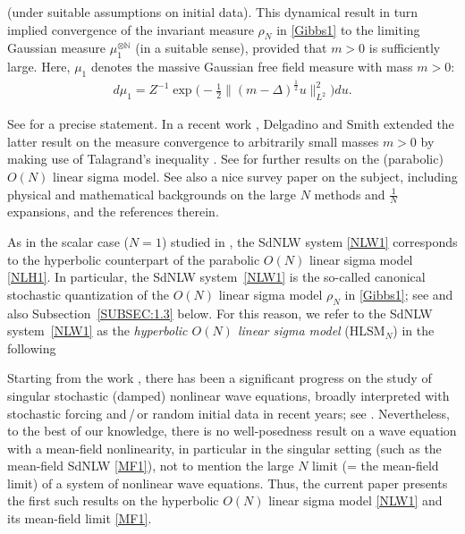 \documentclass[letterpaper, 11pt,  reqno]{amsart}
\newcommand{\1}{\hspace{0.5mm}\text{I}\hspace{0.2mm}}
\newcommand{\noi}{\noindent}
\newcommand{\N}{\mathbb{N}}
\newcommand{\Dl}{\Delta}
\newcommand{\HLSS}{$\text{HLSM}_N$}
\numberwithin{equation}{section}
\numberwithin{theorem}{section}
\begin{document}
\noi
(under suitable assumptions on initial data).
This dynamical result in turn implied
convergence   of the invariant measure $\rho_N$ in \eqref{Gibbs1}
to the limiting Gaussian measure $\mu_1^{\otimes \N}$
(in a suitable sense), 
provided that $m > 0$ is sufficiently large.
Here, 
$\mu_1$
denotes the massive
Gaussian free field measure with mass $m > 0$:
\begin{align}
    d \mu_{1} = Z^{-1} \exp\bigg(-\frac 12  \| (m - \Dl)^\frac 12 u \|_{L^2}^2 \bigg) du.
\label{gauss0}
\end{align}


\noi
See \cite[Theorem 1.2]{SSZZ} for a precise statement.
In a recent work \cite{DS}, 
Delgadino and Smith 
extended the latter result on the measure convergence to 
arbitrarily small masses $m > 0$
by making use of 
Talagrand's inequality
\cite{Tala, OV, FU}.
See \cite{SZZ1, SZZ2}
for further results 
on the (parabolic) $O (N)$ linear sigma model.
See also a nice survey paper 
 \cite{Shen} 
 on the subject, including 
physical and mathematical backgrounds on the large $N$ methods
and $\frac 1N$ expansions,
and the references therein.







As in the scalar case ($N = 1$)
studied in \cite{GKOT}, 
the SdNLW system \eqref{NLW1} corresponds to  the hyperbolic 
counterpart of the 
parabolic $O(N)$ linear sigma model \eqref{NLH1}.
In particular, 
 the SdNLW system~\eqref{NLW1} is the so-called canonical stochastic quantization of the $O(N)$ linear sigma model $\rho_N$ in \eqref{Gibbs1}; see \cite{RSS} and also Subsection~\ref{SUBSEC:1.3} below. For this reason, we  refer to the SdNLW system~\eqref{NLW1} as the {\it hyperbolic $O(N)$ linear sigma model}
 (\HLSS)
 in the following






 Starting from the work \cite{OTh2, GKO}, 
there has been a significant progress on the study 
of singular stochastic (damped) nonlinear wave equations, 
broadly interpreted with stochastic forcing and\,/\,or random initial data
in recent years; 
see
 \cite{
Deya, GKO2, OPTz, GKOT,  Tolo1, OOR, OO,  OOT1, Bring2,  OOT, ORTz,  OOTz, OWZ, 
STzX, BLL,  OTWZ, BDNY,
Zine}.
Nevertheless, to the best of our knowledge, 
there is no well-posedness result  on a wave equation with a mean-field nonlinearity,  
in particular in the singular setting
(such as the mean-field SdNLW \eqref{MF1}), 
 not to mention the large $N$ limit (= the mean-field limit) of a system of nonlinear wave equations. 
Thus, the current paper presents the first such results on the hyperbolic $O(N)$ linear sigma model 
\eqref{NLW1} and its mean-field limit \eqref{MF1}.
\end{document}
